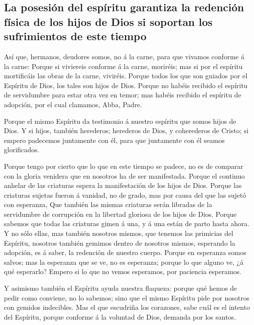 \hypertarget{la-posesiuxf3n-del-espuxedritu-garantiza-la-redenciuxf3n-fuxedsica-de-los-hijos-de-dios-si-soportan-los-sufrimientos-de-este-tiempo}{%
\subsection{La posesión del espíritu garantiza la redención física de
los hijos de Dios si soportan los sufrimientos de este
tiempo}\label{la-posesiuxf3n-del-espuxedritu-garantiza-la-redenciuxf3n-fuxedsica-de-los-hijos-de-dios-si-soportan-los-sufrimientos-de-este-tiempo}}

 Así que, hermanos, deudores somos, no á la carne, para que
vivamos conforme á la carne:  Porque si viviereis conforme
á la carne, moriréis; mas si por el espíritu mortificáis las obras de la
carne, viviréis.  Porque todos los que son guiados por el
Espíritu de Dios, los tales son hijos de Dios.  Porque no
habéis recibido el espíritu de servidumbre para estar otra vez en temor;
mas habéis recibido el espíritu de adopción, por el cual clamamos, Abba,
Padre.

 Porque el mismo Espíritu da testimonio á nuestro espíritu
que somos hijos de Dios.  Y si hijos, también herederos;
herederos de Dios, y coherederos de Cristo; si empero padecemos
juntamente con él, para que juntamente con él seamos glorificados.

 Porque tengo por cierto que lo que en este tiempo se
padece, no es de comparar con la gloria venidera que en nosotros ha de
ser manifestada.  Porque el continuo anhelar de las
criaturas espera la manifestación de los hijos de Dios. 
Porque las criaturas sujetas fueron á vanidad, no de grado, mas por
causa del que las sujetó con esperanza,  Que también las
mismas criaturas serán libradas de la servidumbre de corrupción en la
libertad gloriosa de los hijos de Dios.  Porque sabemos que
todas las criaturas gimen á una, y á una están de parto hasta ahora.
 Y no sólo ellas, mas también nosotros mismos, que tenemos
las primicias del Espíritu, nosotros también gemimos dentro de nosotros
mismos, esperando la adopción, es á saber, la redención de nuestro
cuerpo.  Porque en esperanza somos salvos; mas la esperanza
que se ve, no es esperanza; porque lo que alguno ve, ¿á qué esperarlo?
 Empero si lo que no vemos esperamos, por paciencia
esperamos.

 Y asimismo también el Espíritu ayuda nuestra flaqueza:
porque qué hemos de pedir como conviene, no lo sabemos; sino que el
mismo Espíritu pide por nosotros con gemidos indecibles. 
Mas el que escudriña los corazones, sabe cuál es el intento del
Espíritu, porque conforme á la voluntad de Dios, demanda por los santos.


